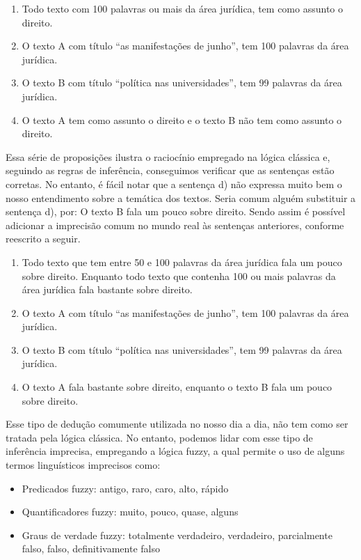 \begin{enumerate}[label=\alph*)] 
\item Todo texto com 100 palavras ou mais da área jurídica, tem como assunto o direito. 
\item O texto A com título ``as manifestações de junho'', tem 100 palavras da área jurídica.  
\item O texto B com título ``política nas universidades'', tem 99 palavras da área jurídica.  
\item O texto A tem como assunto o direito e o texto B não tem como assunto o direito.  
\end{enumerate} 

Essa série de proposições ilustra o raciocínio empregado na lógica clássica e, seguindo as regras de
inferência, conseguimos verificar que as sentenças estão corretas. No entanto, é fácil notar que a
sentença d) não expressa muito bem o nosso entendimento sobre a temática dos textos.  Seria comum
alguém substituir a sentença d), por: O texto B fala um pouco sobre direito.  Sendo assim é possível
adicionar a imprecisão comum no mundo real às sentenças anteriores, conforme reescrito a seguir.

\begin{enumerate}[label=\alph*)] 
\item Todo texto que tem entre 50 e 100 palavras da área jurídica fala um pouco sobre direito.  Enquanto todo texto que contenha 100 ou mais palavras da área jurídica fala bastante sobre direito.  
\item O texto A com título ``as manifestações de junho'', tem 100 palavras da área jurídica.  
\item O texto B com título ``política nas universidades'', tem 99 palavras da área jurídica.  
\item O texto A fala bastante sobre direito, enquanto o texto B fala um pouco sobre direito. 
\end{enumerate} 

Esse tipo de dedução comumente utilizada no nosso dia a dia, não tem como ser tratada pela lógica
clássica. No entanto, podemos lidar com esse tipo de inferência imprecisa, empregando a
lógica fuzzy, a qual permite o uso de alguns termos linguísticos imprecisos como:
\begin{itemize} 
\item Predicados fuzzy: antigo, raro, caro, alto, rápido 
\item Quantificadores fuzzy: muito, pouco, quase, alguns 
\item Graus de verdade fuzzy: totalmente verdadeiro, verdadeiro, parcialmente falso, falso, definitivamente falso 
\end{itemize}


